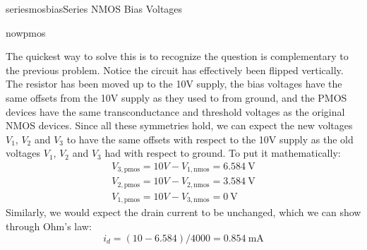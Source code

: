 \begin{mainquestion}{seriesmosbias}{Series NMOS Bias Voltages}
\begin{partquestion}{nowpmos}
\begin{answer}
The quickest way to solve this is to recognize the question is complementary to the previous problem. Notice the circuit has effectively been flipped vertically. The resistor has been moved up to the 10V supply, the bias voltages have the same offsets from the 10V supply as they used to from ground, and the PMOS devices have the same transconductance and threshold voltages as the original NMOS devices. Since all these symmetries hold, we can expect the new voltages $V_{1}$, $V_2$ and $V_3$ to have the same offsets with respect to the 10V supply as the old voltages $V_1$, $V_2$ and $V_3$ had with respect to ground.
To put it mathematically:
\begin{gather*}
    V_{3,\text{pmos}} = 10V - V_{1,\text{nmos}} = \qty{6.584}{\volt}\\
    V_{2,\text{pmos}} = 10V - V_{2,\text{nmos}} = \qty{3.584}{\volt}\\
    V_{1,\text{pmos}} = 10V - V_{3,\text{nmos}} = \qty{0}{\volt}
\end{gather*}
Similarly, we would expect the drain current to be unchanged, which we can show through Ohm's law:
\[
i_d = (10 - 6.584) / 4000 = \qty{0.854}{\milli\ampere}
\]
\end{answer}
\end{partquestion}

\end{mainquestion}
